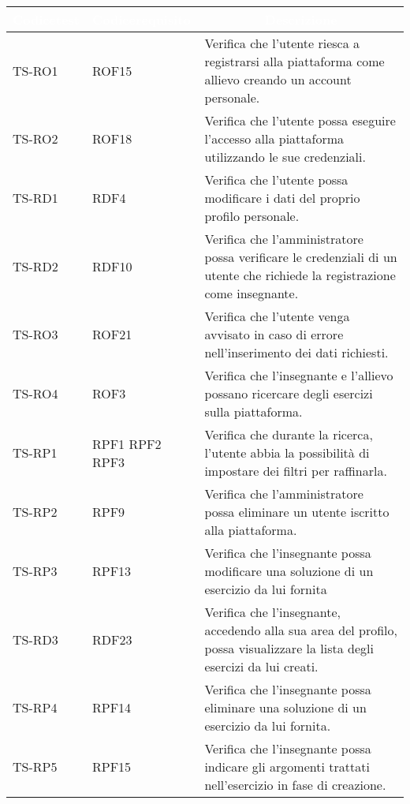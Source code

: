 	\begin{longtable}{|>{\centering\arraybackslash}m{1.6cm}|>{\centering\arraybackslash}m{1.7cm}|m{6.41cm}|}		
		\rowcolor{LightBlue}
		\textbf{\textcolor{white}{Codice\newline test}}
		& \textbf{\textcolor{white}{Codice\newline requisito}}
		& \multicolumn{1}{|c|}{\textbf{\textcolor{white}{ Descrizione}}}\\
		\hline
		\rowcolor{LightGray}
		TS-RO1
		& ROF15
		& Verifica che l'utente riesca a registrarsi alla piattaforma come allievo creando un account personale. 
		\\ \hline
		\rowcolor{white}
		TS-RO2
		& ROF18 
		& Verifica che l'utente possa eseguire l'accesso alla piattaforma utilizzando le sue credenziali.
		\\ \hline
		\rowcolor{LightGray}
		TS-RD1
		& RDF4 
		& Verifica che l'utente possa modificare i dati del proprio profilo personale.
		\\ \hline
		TS-RD2
		& RDF10 
		& Verifica che l'amministratore possa verificare le credenziali di un utente che richiede la registrazione come insegnante. 
		\\ \hline
		\rowcolor{LightGray}
		TS-RO3
		& ROF21 
		& Verifica che l'utente venga avvisato in caso di errore nell'inserimento dei dati richiesti.
		\\ \hline
		TS-RO4		
		& ROF3 
		& Verifica che l'insegnante e l'allievo possano ricercare degli esercizi sulla piattaforma.
		\\ \hline
		\rowcolor{LightGray}
		TS-RP1		
		& RPF1 RPF2 RPF3 
		& Verifica che durante la ricerca, l'utente abbia la possibilità di impostare dei filtri per raffinarla. 		
		\\ \hline
		TS-RP2		
		& RPF9 
		& Verifica che l'amministratore possa eliminare un utente iscritto alla piattaforma.
		\\ \hline
		\rowcolor{LightGray}
		TS-RP3		
		& RPF13 
		& Verifica che l'insegnante possa modificare una soluzione di un esercizio da lui fornita
		\\ \hline
		TS-RD3		
		& RDF23
		& Verifica che l'insegnante, accedendo alla sua area del profilo, possa visualizzare la lista degli esercizi da lui creati. 
		\\ \hline
		\rowcolor{LightGray}
		TS-RP4		
		& RPF14 
		& Verifica che l'insegnante possa eliminare una soluzione di un esercizio da lui fornita. 
		\\ \hline
		TS-RP5		
		& RPF15 
		& Verifica che l'insegnante possa indicare gli argomenti trattati nell'esercizio in fase di creazione.

\end{longtable}
